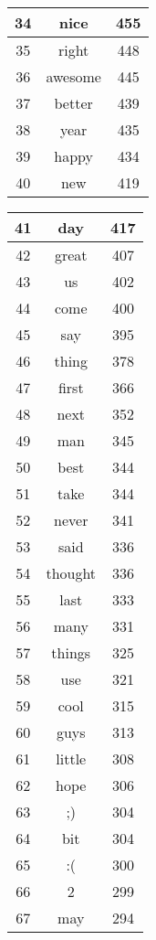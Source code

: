 \begin{table}[!htbp]
\begin{minipage}[b]{.5\textwidth}
\begin{tabular}{|c|c|c|}
		34 & nice & 455 \\ \hline
		35 & right & 448 \\ \hline
		36 & awesome & 445 \\ \hline
		37 & better & 439 \\ \hline
		38 & year & 435 \\ \hline
		39 & happy & 434 \\ \hline
		40 & new & 419 \\ \hline
		\end{tabular}
\end{minipage}
\begin{minipage}[b]{.5\textwidth}
\centering
\begin{tabular}{|c|c|c|} %
		\hline
		41 & day & 417 \\ \hline
		42 & great & 407 \\ \hline
		43 & us & 402 \\ \hline
		44 & come & 400 \\ \hline
		45 & say & 395 \\ \hline
		46 & thing & 378 \\ \hline
		47 & first & 366 \\ \hline
		48 & next & 352 \\ \hline
		49 & man & 345 \\ \hline
		50 & best & 344 \\ \hline
		51 & take & 344 \\ \hline
		52 & never & 341 \\ \hline
		53 & said & 336 \\ \hline
		54 & thought & 336 \\ \hline
		55 & last & 333 \\ \hline
		56 & many & 331 \\ \hline
		57 & things & 325 \\ \hline
		58 & use & 321 \\ \hline
		59 & cool & 315 \\ \hline
		60 & guys & 313 \\ \hline
		61 & little & 308 \\ \hline
		62 & hope & 306 \\ \hline
		63 & ;) & 304 \\ \hline
		64 & bit & 304 \\ \hline
		65 & :( & 300 \\ \hline
		66 & 2 & 299 \\ \hline
		67 & may & 294 \\ \hline

\end{tabular}
\end{minipage}
\end{table}
